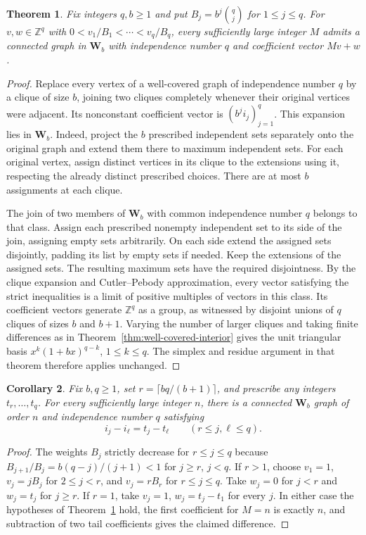 \documentclass[11pt,a4paper]{article}
\newtheorem{theorem}{Theorem}[section]
\newtheorem{corollary}[theorem]{Corollary}
\begin{document}
\begin{theorem}\label{thm:weighted-exact}
Fix integers $q,b\ge1$ and put $B_j=b^j\binom qj$ for $1\le j\le q$.
For $v,w\in\mathbb Z^q$ with
$0<v_1/B_1<\cdots<v_q/B_q$, every sufficiently large integer $M$
admits a connected graph in $\mathbf W_b$ with independence number $q$
and coefficient vector $Mv+w$.
\end{theorem}
\begin{proof}
Replace every vertex of a well-covered graph of independence number
$q$ by a clique of size $b$, joining two cliques completely whenever
their original vertices were adjacent. Its nonconstant coefficient
vector is $(b^ji_j)_{j=1}^q$. This expansion lies in $\mathbf W_b$.
Indeed, project the $b$ prescribed independent sets separately onto
the original graph and extend them there to maximum independent sets.
For each original vertex, assign distinct vertices in its clique to
the extensions using it, respecting the already distinct prescribed
choices. There are at most $b$ assignments at each clique.

The join of two members of $\mathbf W_b$ with common independence
number $q$ belongs to that class. Assign each prescribed nonempty
independent set to its side of the join, assigning empty sets arbitrarily.
On each side extend the assigned sets disjointly, padding its list by
empty sets if needed. Keep the extensions of the assigned sets. The
resulting maximum sets have the required disjointness. By the clique
expansion and Cutler--Pebody approximation, every vector satisfying
the strict inequalities is a limit of positive multiples of vectors
in this class. Its coefficient vectors generate $\mathbb Z^q$ as a
group, as witnessed by disjoint unions of $q$ cliques of sizes $b$ and
$b+1$. Varying the number of larger cliques and taking finite differences
as in Theorem~\ref{thm:well-covered-interior} gives the unit triangular
basis $x^k(1+bx)^{q-k}$, $1\le k\le q$. The simplex and residue
argument in that theorem therefore applies unchanged.
\end{proof}

\begin{corollary}\label{cor:prescribed-gaps}
Fix $b,q\ge1$, set $r=\lceil bq/(b+1)\rceil$, and prescribe any
integers $t_r,\ldots,t_q$. For every sufficiently large integer $n$,
there is a connected $\mathbf W_b$ graph of order $n$ and independence
number $q$ satisfying
\[
 i_j-i_\ell=t_j-t_\ell\qquad(r\le j,\ell\le q).
\]
\end{corollary}
\begin{proof}
The weights $B_j$ strictly decrease for $r\le j\le q$ because
$B_{j+1}/B_j=b(q-j)/(j+1)<1$ for $j\ge r$, $j<q$.
If $r>1$, choose $v_1=1$, $v_j=jB_j$ for $2\le j<r$, and
$v_j=rB_r$ for $r\le j\le q$. Take $w_j=0$ for $j<r$ and $w_j=t_j$
for $j\ge r$. If $r=1$, take $v_j=1$, $w_j=t_j-t_1$ for every $j$.
In either case the hypotheses of Theorem~\ref{thm:weighted-exact} hold,
the first coefficient for $M=n$ is exactly $n$, and subtraction of two
tail coefficients gives the claimed difference.
\end{proof}
\end{document}
